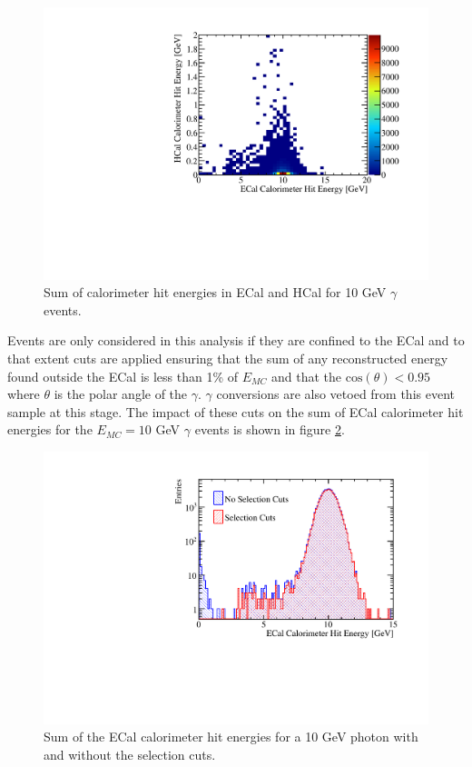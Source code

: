 \begin{figure}
  \includegraphics[width=\largefigwidth]{EnergyEstimators/Plots/Calibration/Digitsation/ECal/ECalHCalPhotonSplit.pdf}
  \caption[Sum of calorimeter hit energies in ECal and HCal for 10 GeV $\gamma$ events.]{Sum of calorimeter hit energies in ECal and HCal for 10 GeV $\gamma$ events.}
  \label{fig:ecaldigiphotonsplit}
\end{figure}

Events are only considered in this analysis if they are confined to the ECal and to that extent cuts are applied ensuring that the sum of any reconstructed energy found outside the ECal is less than 1\% of $E_{MC}$ and that the $\text{cos}(\theta) < 0.95$ where $\theta$ is the polar angle of the $\gamma$.  $\gamma$ conversions are also vetoed from this event sample at this stage.  The impact of these cuts on the sum of ECal calorimeter hit energies for the $E_{MC} = 10$ GeV $\gamma$ events is shown in figure \ref{fig:ecaldigiselection}.

\begin{figure}
\includegraphics[width=\largefigwidth]{EnergyEstimators/Plots/Calibration/Digitsation/ECal/DigitisationECalSelection.pdf}
\caption[Sum of the ECal calorimeter hit energies for a 10 GeV photon with and without the selection cuts.]{Sum of the ECal calorimeter hit energies for a 10 GeV photon with and without the selection cuts.}
\label{fig:ecaldigiselection}
\end{figure}

